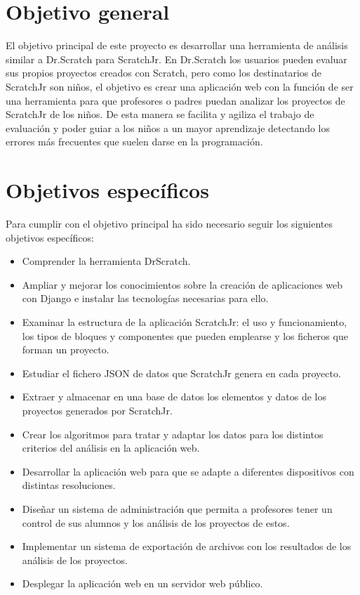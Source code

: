 \documentclass[a4paper, 12pt]{book}
\begin{document}
\section{Objetivo general} %
\label{sec:objetivo-general} %

El objetivo principal de este proyecto es desarrollar una herramienta de análisis similar a Dr.Scratch para ScratchJr.
En Dr.Scratch los usuarios pueden evaluar sus propios proyectos creados con Scratch, pero como los destinatarios de ScratchJr son niños, el objetivo es crear una aplicación web con la función de ser una herramienta para que profesores o padres puedan analizar los proyectos de ScratchJr de los niños.
De esta manera se facilita y agiliza el trabajo de evaluación y poder guiar a los niños a un mayor aprendizaje detectando los errores más frecuentes que suelen darse en la programación.


\section{Objetivos específicos}
\label{sec:objetivos-especificos}

Para cumplir con el objetivo principal ha sido necesario seguir los siguientes objetivos específicos:

\begin{itemize}
    \item Comprender la herramienta DrScratch.
    \item Ampliar y mejorar los conocimientos sobre la creación de aplicaciones web con Django e instalar las tecnologías necesarias para ello.
    \item Examinar la estructura de la aplicación ScratchJr: el uso y funcionamiento, los tipos de bloques y componentes que pueden emplearse y los ficheros que forman un proyecto.
    \item Estudiar el fichero JSON de datos que ScratchJr genera en cada proyecto.
    \item Extraer y almacenar en una base de datos los elementos y datos de los proyectos generados por ScratchJr.
    \item Crear los algoritmos para tratar y adaptar los datos para los distintos criterios del análisis en la aplicación web.
    \item Desarrollar la aplicación web para que se adapte a diferentes dispositivos con distintas resoluciones.
    \item Diseñar un sistema de administración que permita a profesores tener un control de sus alumnos y los análisis de los proyectos de estos.
    \item Implementar un sistema de exportación de archivos con los resultados de los análisis de los proyectos.
    \item Desplegar la aplicación web en un servidor web público.
    
\end{itemize}
\end{document}
